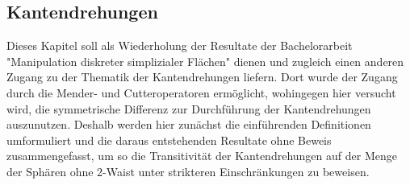 \documentclass[12pt,titlepage,twoside,cleardoublepage]{article}
\theoremstyle{nummermitklammern}
\newtheorem{definition}[temp]{Definition}
\newtheorem{definition}[zahl]{Definition}
\numberwithin{equation}{section}
\begin{document}
 \subsection{Kantendrehungen}
Dieses Kapitel soll als Wiederholung der Resultate der Bachelorarbeit "Manipulation diskreter simplizialer Flächen"  dienen und zugleich einen anderen Zugang zu der Thematik der Kantendrehungen liefern. Dort wurde der Zugang durch die Mender- und Cutteroperatoren ermöglicht, wohingegen hier versucht wird, die symmetrische Differenz zur Durchführung der Kantendrehungen auszunutzen. Deshalb werden hier zunächst die einführenden Definitionen umformuliert und die daraus entstehenden Resultate ohne Beweis zusammengefasst, um so die Transitivität der Kantendrehungen auf der Menge der Sphären ohne 2-Waist unter strikteren Einschränkungen zu beweisen. 
\begin{comment} 
 \begin{definition}
 Sei $(X,<)$ eine geschlossene simpliziale Fläche mit paarweise verschiedenen Ecken $V_1\ldots V_4$, Kanten $e_1,\ldots,e_5$ und Flächen $F_1,F_2$ in $X$,
  die folgendes erfüllen:
\begin{itemize}
\item $X_2(e_1))=\{F_1,F_2\}$
 \item $X_0(X_2(e_1))=\{V_1,V_2,V_3,V_4\}$
\item $deg(V)\neq 2$ für  alle $V\in X_0(e_1)=\{V_2, V_4\}$
\item $(X_0(e_2),X_0(e_3),X_0(e_4),X_0(e_5))=(\{V_1,V_2\},\{V_2,V_3\},\{V_3,V_4\},\{V_1,V_4\})$
\item $(X_1(F_1),X_1(F_2))=(\{e_1,e_2,e_5\},\{e_1,e_3,e_4\})$
\end{itemize} 
\begin{figure}[H]
\begin{center}
\texttt{[image: Image\_ButterflyDeletion]}
\end{center}
\caption{Dreieck}
\end{figure}
  Dann definiert man die durch die Kantendrehung $e_1$ entstandene simpliziale Fläche $X^{e_1}$ durch das ordinale Symbol $\mu (X^{e_1})$, welches entsteht, wenn man beim ordinalen Symbol $\mu((X,<))$
 \begin{itemize}
 \item an der Stelle $e_1$ den Eintrag $X_0(e_1)$ durch $\{V_1,V_3\}$ ersetzt,
 \item an der Stelle $F_1$ den Eintrag $X_1(F_1)$ durch $\{e_1,e_2,e_3\}$ ersetzt, 
 \item und an der Stelle $F_2$ den Eintrag $X_1(F_2)$ durch den Eintrag $\{e_1,e_4,e_5\}$ ersetzt.
 \begin{figure}[H]
\begin{center}
\texttt{[image: Image\_Edgeturn]}
\end{center}
\caption{Dreieck}
\end{figure}
 \end{itemize}
  Für $X^{e_1}$ gilt dann 
 \[
X_i =X^{e_1}_i \text{ fuer i=0,1,2}
 \]
 und 
 \[
\chi (X)=\chi(X^{e_1}). 
 \]
 \end{definition}
\end{comment}
\end{document}

